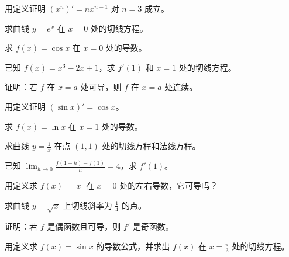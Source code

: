 \begin{exercise}[4]
用定义证明 \((x^n)' = nx^{n-1}\) 对 \(n=3\) 成立。
\end{exercise}
\begin{exercise}[4]
求曲线 \(y=e^x\) 在 \(x=0\) 处的切线方程。
\end{exercise}
\begin{exercise}[4]
求 \(f(x)=\cos x\) 在 \(x=0\) 处的导数。
\end{exercise}
\begin{exercise}[4]
已知 \(f(x)=x^3-2x+1\)，求 \(f'(1)\) 和 \(x=1\) 处的切线方程。
\end{exercise}
\begin{exercise}[4]
证明：若 \(f\) 在 \(x=a\) 处可导，则 \(f\) 在 \(x=a\) 处连续。
\end{exercise}

\begin{exercise}[5]
用定义证明 \((\sin x)' = \cos x\)。
\end{exercise}
\begin{exercise}[5]
求 \(f(x)=\ln x\) 在 \(x=1\) 处的导数。
\end{exercise}
\begin{exercise}[5]
求曲线 \(y=\frac{1}{x}\) 在点 \((1,1)\) 处的切线方程和法线方程。
\end{exercise}
\begin{exercise}[5]
已知 \(\lim_{h\to0} \frac{f(1+h)-f(1)}{h} = 4\)，求 \(f'(1)\)。
\end{exercise}

\begin{exercise}[6]
用定义求 \(f(x)=|x|\) 在 \(x=0\) 处的左右导数，它可导吗？
\end{exercise}
\begin{exercise}[6]
求曲线 \(y=\sqrt{x}\) 上切线斜率为 \(\frac{1}{4}\) 的点。
\end{exercise}
\begin{exercise}[6]
证明：若 \(f\) 是偶函数且可导，则 \(f'\) 是奇函数。
\end{exercise}

\begin{exercise}[7]
用定义求 \(f(x)=\sin x\) 的导数公式，并求出 \(f(x)\) 在 \(x=\frac{\pi}{3}\) 处的切线方程。
\end{exercise}

